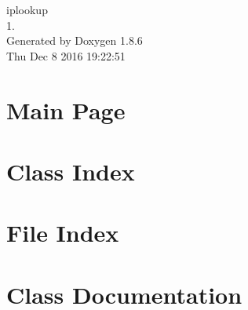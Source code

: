 \documentclass[twoside]{book}
\newcommand{\clearemptydoublepage}{%
  \newpage{\pagestyle{empty}\cleardoublepage}%
}
\begin{document}
\hypersetup{pageanchor=false}
\begin{titlepage}
\vspace*{7cm}
\begin{center}%
{\Large iplookup \\[1ex]\large 1. }\\
\vspace*{1cm}
{\large Generated by Doxygen 1.8.6}\\
\vspace*{0.5cm}
{\small Thu Dec 8 2016 19:22:51}\\
\end{center}
\end{titlepage}
\clearemptydoublepage
\tableofcontents
\clearemptydoublepage
{}
\hypersetup{pageanchor=true}

\chapter{Main Page}
\label{index}\hypertarget{index}{}
\chapter{Class Index}

\chapter{File Index}

\chapter{Class Documentation}



































\end{document}

